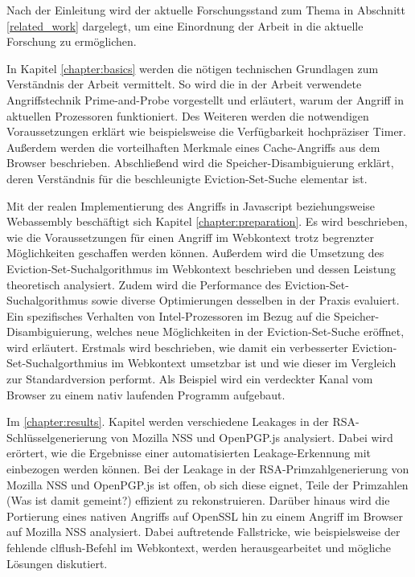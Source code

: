 \par \medskip                         

Nach der Einleitung wird der aktuelle Forschungsstand zum Thema in Abschnitt \ref{related_work} dargelegt, um eine Einordnung der Arbeit in die aktuelle Forschung zu ermöglichen.

\par \medskip                     

In Kapitel \ref{chapter:basics} werden die nötigen technischen Grundlagen zum Verständnis der Arbeit vermittelt.
So wird die in der Arbeit verwendete Angriffstechnik Prime-and-Probe vorgestellt und erläutert, warum der Angriff in aktuellen Prozessoren funktioniert.
Des Weiteren werden die notwendigen Voraussetzungen erklärt wie beispielsweise die Verfügbarkeit hochpräziser Timer.
Außerdem werden die vorteilhaften Merkmale eines Cache-Angriffs aus dem Browser beschrieben.
Abschließend wird die Speicher-Disambiguierung erklärt, deren Verständnis für die beschleunigte Eviction-Set-Suche elementar ist.

\par \medskip                     

Mit der realen Implementierung des Angriffs in Javascript beziehungsweise Webassembly beschäftigt sich Kapitel \ref{chapter:preparation}.
Es wird beschrieben, wie die Voraussetzungen für einen Angriff im Webkontext trotz begrenzter Möglichkeiten geschaffen werden können.
Außerdem wird die Umsetzung des Eviction-Set-Suchalgorithmus im Webkontext beschrieben und dessen Leistung theoretisch analysiert.
Zudem wird die Performance des Eviction-Set-Suchalgorithmus sowie diverse Optimierungen desselben in der Praxis evaluiert.
Ein spezifisches Verhalten von Intel-Prozessoren im Bezug auf die Speicher-Disambiguierung, welches neue Möglichkeiten in der Eviction-Set-Suche eröffnet, wird erläutert.
Erstmals wird beschrieben, wie damit ein verbesserter Eviction-Set-Suchalgorthmius im Webkontext umsetzbar ist und wie dieser im Vergleich zur Standardversion performt.
Als Beispiel wird ein verdeckter Kanal vom Browser zu einem nativ laufenden Programm aufgebaut.

\par \medskip                      

Im \ref{chapter:results}. Kapitel werden verschiedene Leakages in der RSA-Schlüsselgenerierung von Mozilla NSS und OpenPGP.js analysiert.
Dabei wird erörtert, wie die Ergebnisse einer automatisierten Leakage-Erkennung mit einbezogen werden können.
Bei der Leakage in der RSA-Primzahlgenerierung von Mozilla NSS und OpenPGP.js ist offen, ob sich diese eignet, Teile der Primzahlen (Was ist damit gemeint?) effizient zu rekonstruieren.
Darüber hinaus wird die Portierung eines nativen Angriffs auf OpenSSL hin zu einem Angriff im Browser auf Mozilla NSS analysiert.
Dabei auftretende Fallstricke, wie beispielsweise der fehlende clflush-Befehl im Webkontext, werden herausgearbeitet und mögliche Lösungen diskutiert.

